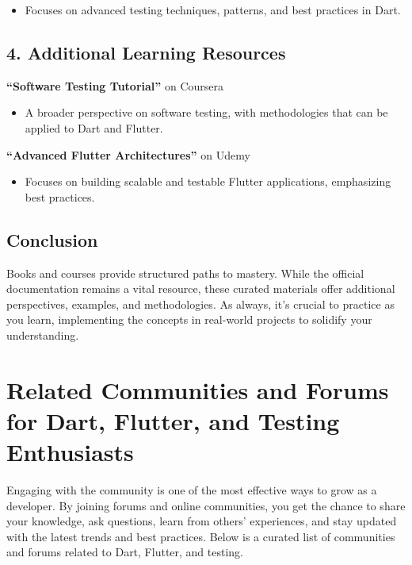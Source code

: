 \documentclass[
]{article}
\providecommand{\tightlist}{%
  \setlength{\itemsep}{0pt}\setlength{\parskip}{0pt}}
\begin{document}
\begin{itemize}
\tightlist
\item
  Focuses on advanced testing techniques, patterns, and best practices
  in Dart.
\end{itemize}

\subsection{4. Additional Learning
Resources}\label{additional-learning-resources}

\textbf{``Software Testing Tutorial''} on Coursera

\begin{itemize}
\tightlist
\item
  A broader perspective on software testing, with methodologies that can
  be applied to Dart and Flutter.
\end{itemize}

\textbf{``Advanced Flutter Architectures''} on Udemy

\begin{itemize}
\tightlist
\item
  Focuses on building scalable and testable Flutter applications,
  emphasizing best practices.
\end{itemize}

\subsection{Conclusion}\label{conclusion-18}

Books and courses provide structured paths to mastery. While the
official documentation remains a vital resource, these curated materials
offer additional perspectives, examples, and methodologies. As always,
it's crucial to practice as you learn, implementing the concepts in
real-world projects to solidify your understanding.

\section{Related Communities and Forums for Dart, Flutter, and Testing
Enthusiasts}\label{related-communities-and-forums-for-dart-flutter-and-testing-enthusiasts}

Engaging with the community is one of the most effective ways to grow as
a developer. By joining forums and online communities, you get the
chance to share your knowledge, ask questions, learn from others'
experiences, and stay updated with the latest trends and best practices.
Below is a curated list of communities and forums related to Dart,
Flutter, and testing.
\end{document}
